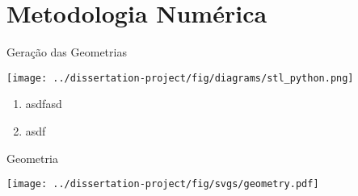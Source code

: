 \section{Metodologia Numérica}

\begin{frame}{Geração das Geometrias}
    \begin{minipage}[c]{0.55\textwidth}
        \centering
        \texttt{[image: ../dissertation-project/fig/diagrams/stl\_python.png]}
    \end{minipage}
    \hfill
    \begin{minipage}[c]{0.36\textwidth}
        \begin{enumerate}
            \item asdfasd
            \item asdf
        \end{enumerate}
    \end{minipage}
    \end{frame}

\begin{frame}{Geometria}
    \begin{minipage}[c]{0.58\textwidth}
        \texttt{[image: ../dissertation-project/fig/svgs/geometry.pdf]}
    \end{minipage}
    \hfill
    \begin{minipage}[c]{0.38\textwidth}
    \end{minipage}
\end{frame}


